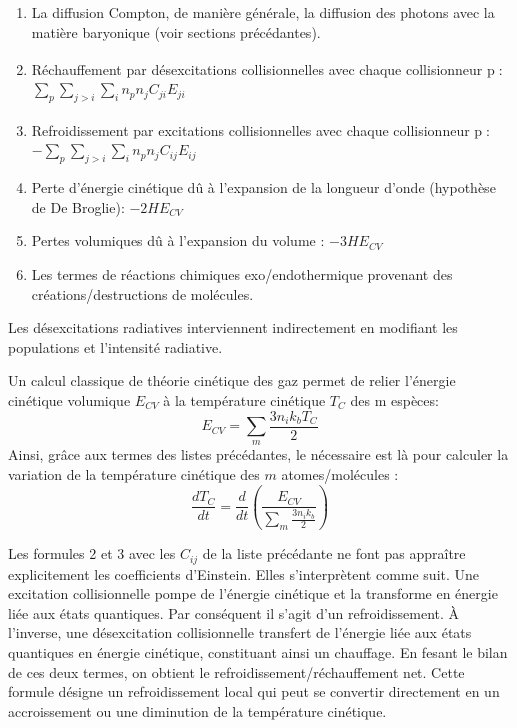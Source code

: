 \documentclass[10pt, a4paper]{report}
\numberwithin{equation}{subsection}
\begin{document}
\begin{enumerate}
	\item La diffusion Compton, de manière générale, la diffusion des photons avec la matière baryonique (voir sections précédantes).
	\item Réchauffement par désexcitations collisionnelles avec chaque collisionneur p\textsuperscript{\cite{RADEX} \cite{KWO}} :\\ $\sum\limits_p\sum\limits_{j>i}\sum\limits_i n_p n_j C_{ji}E_{ji}$
	\item Refroidissement par excitations collisionnelles avec chaque collisionneur p\textsuperscript{\cite{RADEX} \cite{KWO}} :\\ $-\sum\limits_p\sum\limits_{j>i}\sum\limits_i n_p n_j C_{ij}E_{ij}$
	\item Perte d'énergie cinétique dû à l'expansion de la longueur d'onde (hypothèse de De Broglie): $-2H E_{CV}$
	\item Pertes volumiques dû à l'expansion du volume : $-3H E_{CV}$
	\item Les termes de réactions chimiques exo/endothermique provenant des créations/destructions de molécules.
\end{enumerate}
\medskip
\normalsize
Les désexcitations radiatives interviennent indirectement en modifiant les populations et l'intensité radiative.

Un calcul classique de théorie cinétique des gaz permet de relier l'énergie cinétique volumique $E_{CV}$ à la température cinétique $T_C$ des m espèces:
\begin{equation} \label{eq:ECTC}
 \boxed{E_{CV} = \sum\limits_m  \frac{3 n_i k_b T_C}{2}}
\end{equation}
Ainsi, grâce aux termes des listes précédantes, le nécessaire est là pour calculer la variation de la température cinétique des $m$ atomes/molécules :
\begin{equation} \label{eq:VTC}
 \boxed{\frac{dT_C }{dt} = \frac{d}{dt}\left(\frac{E_{CV}}{\sum\limits_m  \frac{3 n_i k_b}{2}}\right)}
\end{equation}

Les formules 2 et 3 avec les $C_{ij}$ de la liste précédante ne font pas appraître explicitement les coefficients d'Einstein. Elles s'interprètent comme suit. Une excitation collisionnelle pompe de l'énergie cinétique et la transforme en énergie liée aux états quantiques. Par conséquent il s'agit d'un refroidissement. À l'inverse, une désexcitation collisionnelle transfert de l'énergie liée aux états quantiques en énergie cinétique, constituant ainsi un chauffage. En fesant le bilan de ces deux termes, on obtient le refroidissement/réchauffement net. Cette formule désigne un refroidissement local qui peut se convertir directement en un accroissement ou une diminution de la température cinétique.
\end{document}

